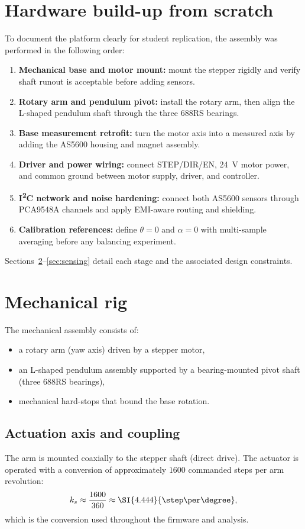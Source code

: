 \section{Hardware build-up from scratch}
\label{sec:hardware_build}
To document the platform clearly for student replication, the assembly was performed in the following order:
\begin{enumerate}
  \item \textbf{Mechanical base and motor mount:} mount the stepper rigidly and verify shaft runout is acceptable before adding sensors.
  \item \textbf{Rotary arm and pendulum pivot:} install the rotary arm, then align the L-shaped pendulum shaft through the three 688RS bearings.
  \item \textbf{Base measurement retrofit:} turn the motor axis into a measured axis by adding the AS5600 housing and magnet assembly.
  \item \textbf{Driver and power wiring:} connect STEP/DIR/EN, \SI{24}{V} motor power, and common ground between motor supply, driver, and controller.
  \item \textbf{I\textsuperscript{2}C network and noise hardening:} connect both AS5600 sensors through PCA9548A channels and apply EMI-aware routing and shielding.
  \item \textbf{Calibration references:} define $\theta=0$ and $\alpha=0$ with multi-sample averaging before any balancing experiment.
\end{enumerate}
Sections~\ref{sec:mechanical_rig}--\ref{sec:sensing} detail each stage and the associated design constraints.

\section{Mechanical rig}
\label{sec:mechanical_rig}
The mechanical assembly consists of:
\begin{itemize}
  \item a rotary arm (yaw axis) driven by a stepper motor,
  \item an L-shaped pendulum assembly supported by a bearing-mounted pivot shaft (three 688RS bearings),
  \item mechanical hard-stops that bound the base rotation.
\end{itemize}

\subsection*{Actuation axis and coupling}
The arm is mounted coaxially to the stepper shaft (direct drive). The actuator is operated with a conversion of approximately $1600$ commanded steps per arm revolution:
\[
k_s \approx \frac{1600}{360} \approx \SI{4.444}{\step\per\degree},
\]
which is the conversion used throughout the firmware and analysis.

